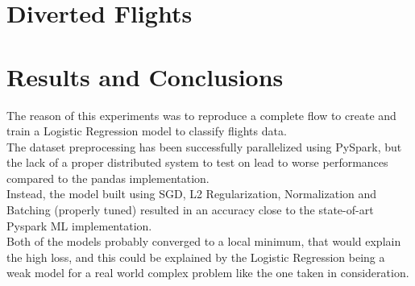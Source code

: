 \documentclass[
	letterpaper, %
	10pt, %
]{class}
\begin{document}
\section{Diverted Flights}


\section{Results and Conclusions}

The reason of this experiments was to reproduce a complete flow to create and train a Logistic Regression model to classify flights data.\\
The dataset preprocessing has been successfully parallelized using PySpark, but the lack of a proper distributed system to test on lead to worse performances compared to the pandas implementation.\\

Instead, the model built using SGD, L2 Regularization, Normalization and Batching (properly tuned) resulted in an accuracy close to the state-of-art Pyspark ML implementation.\\
Both of the models probably converged to a local minimum, that would explain the high loss, and this could be explained by the Logistic Regression being a weak model for a real world complex problem like the one taken in consideration.


\printbibliography %

\end{document}
